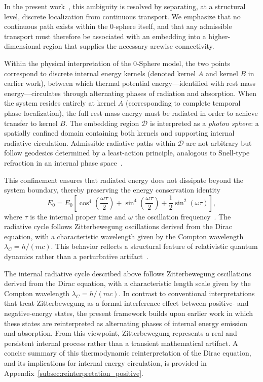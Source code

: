 \documentclass[%
 reprint,
 amsmath,amssymb,
 aps,
 prb,
]{revtex4-2}
\numberwithin{equation}{section}
\begin{document}
In the present work~\cite{hanamura18067760,hanamura18135855,hanamura18203433}, this ambiguity is resolved by separating, at a structural level, discrete localization from continuous transport.
We emphasize that no continuous path exists within the 0-sphere itself, and that any admissible transport must therefore be associated with an embedding into a higher-dimensional region that supplies the necessary arcwise connectivity.

Within the physical interpretation of the 0-Sphere model, the two points correspond to discrete internal energy kernels (denoted kernel $A$ and kernel $B$ in earlier work), between which thermal potential energy—identified with rest mass energy—circulates through alternating phases of radiation and absorption.
When the system resides entirely at kernel $A$ (corresponding to complete temporal phase localization), the full rest mass energy must be radiated in order to achieve transfer to kernel $B$.
The embedding region $\mathcal{D}$ is interpreted as a \textit{photon sphere}: a spatially confined domain containing both kernels and supporting internal radiative circulation.
Admissible radiative paths within $\mathcal{D}$ are not arbitrary but follow geodesics determined by a least-action principle, analogous to Snell-type refraction in an internal phase space~\cite{hanamura17765336}.

This confinement ensures that radiated energy does not dissipate beyond the system boundary, thereby preserving the energy conservation identity
\begin{equation}
E_0
=
E_0\!\left[
\cos^4\!\left(\frac{\omega\tau}{2}\right)
+
\sin^4\!\left(\frac{\omega\tau}{2}\right)
+
\frac{1}{2}\sin^2(\omega\tau)
\right],
\label{eq:energy_conservation}
\end{equation}
where $\tau$ is the internal proper time and $\omega$ the oscillation frequency~\cite{hanamura17765136,hanamura17764997}.
The radiative cycle follows Zitterbewegung oscillations derived from the Dirac equation, with a characteristic wavelength given by the Compton wavelength $\lambda_C = h/(mc)$.
This behavior reflects a structural feature of relativistic quantum dynamics rather than a perturbative artifact~\cite{Schrodinger1930,Thaller1992}.


The internal radiative cycle described above follows Zitterbewegung oscillations derived from the Dirac equation, with a characteristic length scale given by the Compton wavelength $\lambda_C = h/(mc)$.
In contrast to conventional interpretations that treat Zitterbewegung as a formal interference effect between positive- and negative-energy states, the present framework builds upon earlier work in which these states are reinterpreted as alternating phases of internal energy emission and absorption.
From this viewpoint, Zitterbewegung represents a real and persistent internal process rather than a transient mathematical artifact.
A concise summary of this thermodynamic reinterpretation of the Dirac equation, and its implications for internal energy circulation, is provided in Appendix~\ref{subsec:reinterpretation_positive}.
\end{document}
